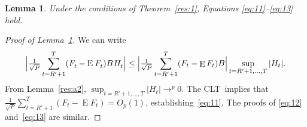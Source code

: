 \documentclass[12pt,fleqn]{article}
\newtheorem{lema}{Lemma}[section]
\theoremstyle{definition}
\DeclareMathOperator{\E}{E}
\newcommand{\osumb}[1]{\sum_{#1=R'+1}^T}
\newcommand{\ocltb}[1]{\tfrac{1}{\sqrt{P}} \osumb{#1}}
\newcommand{\clt}{CLT}
\begin{document}
\begin{lema}\label{res:a4}
  Under the conditions of Theorem~\ref{res:1}, Equations
  \eqref{eq:11}--\eqref{eq:13} hold.
\end{lema}

\begin{proof}[Proof of Lemma~\ref{res:a4}]
We can write
\begin{equation*}
  \Big\lvert \WesA \Big\rvert \leq
  \Big\lvert \ocltb{t} (F_t - \E F_t) B \Big\rvert
  \sup_{t = R'+1,\dots,T} | H_t |.
\end{equation*}
From Lemma~\ref{res:a2}, $\sup_{t = R'+1,\dots,T} | H_t | \to^p 0$. The \clt\ implies
that $\ocltb{t} (F_t - \E F_t) = O_p(1)$,
establishing~\eqref{eq:11}. The proofs of \eqref{eq:12}
and~\eqref{eq:13} are similar.
\end{proof}


\end{document}
